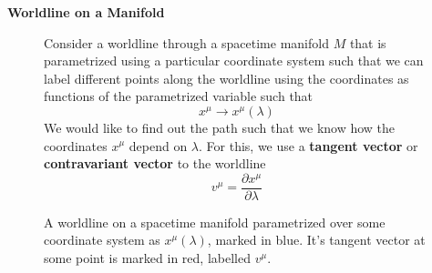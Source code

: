 \documentclass{article}
\begin{document}
 		\begin{exmp}
 			\textbf{Worldline on a Manifold}
 			\begin{figure}[h]
 				\begin{minipage}{0.4\textwidth}
 					\center
 					\caption{A worldline on a spacetime manifold parametrized over some coordinate system as $x^{\mu} (\lambda)$, marked in blue. It's tangent vector at some point is marked in red, labelled $v^\mu$.}
 				\end{minipage}
 				\begin{minipage}{0.56\textwidth}
 					\begin{spacing}{1.5}
 						Consider a worldline through a spacetime manifold $M$ that is parametrized using a particular coordinate system such that we can label different points along the worldline using the coordinates as functions of the parametrized variable such that
 						$$ x^\mu \to x^\mu (\lambda)$$
 						We would like to find out the path such that we know how the coordinates $x^\mu$ depend on $\lambda$. For this, we use a \textbf{tangent vector} or \textbf{contravariant vector} to the worldline
 						\begin{equation}
 							\label{eq:TangetVectorWorldline}
 							\boxed{v^\mu = \frac{\partial x^\mu}{\partial \lambda}}
 						\end{equation}
 					\end{spacing}
 				\end{minipage}
 			\end{figure}
 		

\end{exmp}
\end{document}
